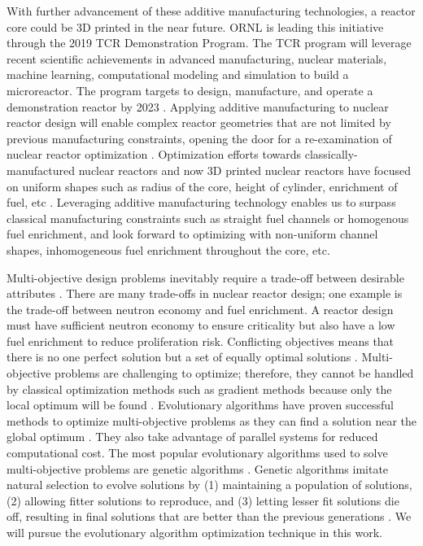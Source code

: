 With further advancement of these additive manufacturing technologies, a reactor 
core could be 3D printed in the near future. 
\gls{ORNL} is leading this initiative through the 2019 \gls{TCR} Demonstration 
Program. 
The \gls{TCR} program will leverage recent scientific achievements in advanced 
manufacturing, nuclear materials, machine learning, computational modeling 
and simulation to build a microreactor. 
The program targets to design, manufacture, and operate a demonstration reactor 
by 2023 \cite{terrani_transformational_2019}. 
Applying additive manufacturing to nuclear reactor design will enable complex 
reactor geometries that are not limited by previous manufacturing constraints,
opening the door for a re-examination of nuclear reactor optimization 
\cite{sobes_artificial_2020}. 
Optimization efforts towards classically-manufactured nuclear reactors and now
3D printed nuclear reactors have focused on uniform shapes such as radius of the 
core, height of cylinder, enrichment of fuel, etc 
\cite{sobes_artificial_2020,sacco_two_2006,kumar_new_2015,pereira_parallel_2008}. 
Leveraging additive manufacturing technology enables us to surpass classical 
manufacturing constraints such as straight fuel channels or homogenous fuel 
enrichment, and look forward to optimizing with non-uniform channel shapes, 
inhomogeneous fuel enrichment throughout the core, etc.

Multi-objective design problems inevitably require a trade-off between 
desirable attributes \cite{byrne_evolving_2014,simon_sciences_2019}. 
There are many trade-offs in nuclear reactor design; one example is the 
trade-off between neutron economy and fuel enrichment.
A reactor design must have sufficient neutron economy to ensure criticality but 
also have a low fuel enrichment to reduce proliferation risk. 
Conflicting objectives means that there is no one perfect solution but a set
of equally optimal solutions \cite{byrne_evolving_2014}.
Multi-objective problems are challenging to optimize; therefore, they cannot be 
handled by classical optimization methods such as gradient methods because only 
the local optimum will be found \cite{renner_genetic_2003}. 
Evolutionary algorithms have proven successful methods to optimize 
multi-objective problems \cite{krish_practical_2011} as 
they can find a solution near the global optimum \cite{renner_genetic_2003}.
They also take advantage of parallel systems for reduced computational cost.
The most popular evolutionary algorithms used to solve multi-objective 
problems are genetic algorithms 
\cite{byrne_evolving_2014, krish_practical_2011}. 
Genetic algorithms imitate natural selection to evolve solutions 
by (1) maintaining a population of solutions, (2) allowing 
fitter solutions to reproduce, and (3) letting lesser fit solutions die off, 
resulting in final solutions that are better than the previous generations 
\cite{renner_genetic_2003}. 
We will pursue the evolutionary algorithm optimization technique 
in this work. 

